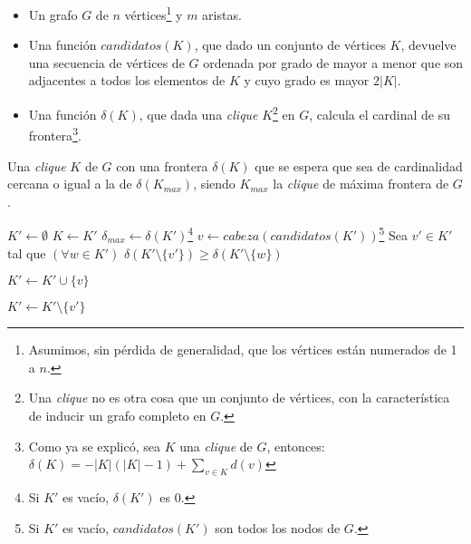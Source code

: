 \begin{pseudocodigo}
    \Require\Statex
        \begin{itemize}
            \item Un grafo $G$ de $n$ v\'ertices\footnote{Asumimos, sin p\'erdida 
                de generalidad, que los v\'ertices est\'an numerados de 1 a $n$.}
                y $m$ aristas.

            \item Una funci\'on $candidatos(K)$, que dado un conjunto de v\'ertices
                $K$, devuelve una secuencia de v\'ertices de $G$ ordenada por grado
                de mayor a menor que son adjacentes a todos los elementos de $K$ y
                cuyo grado es mayor $2|K|$.

            \item Una funci\'on $\delta(K)$, que dada una \emph{clique} $K$\footnote{Una
                \emph{clique} no es otra cosa que un conjunto de v\'ertices, con la
                caracter\'istica de inducir un grafo completo en $G$.} en $G$, calcula
                el cardinal de su frontera\footnote{Como ya se explic\'o, sea $K$ una
                \emph{clique} de $G$, entonces: $\delta(K) = - |K|(|K|-1) +
                \displaystyle\sum_{v \in K} d(v)$}.
        \end{itemize}

    \Statex
    \Ensure Una \emph{clique} $K$ de $G$ con una frontera $\delta(K)$ que se
        espera que sea de cardinalidad cercana o igual a la de $\delta(K_{max})$,
        siendo $K_{max}$ la \emph{clique} de m\'axima frontera de $G$.

    \Statex
    \State $K' \gets \emptyset$
    \Repeat
        \State $K \gets K'$
        \State $\delta_{max} \gets \delta(K')$\footnote{Si $K'$ es vac\'io, $\delta(K')$ es $0$.}
        \State $v \gets cabeza(candidatos(K'))$\footnote{Si $K'$ es vac\'io, $candidatos(K')$ son todos
            los nodos de $G$.}
        \State Sea $v' \in K'$ tal que $(\forall w \in K')$
            $\delta(K' \setminus \{v'\}) \geq \delta(K' \setminus \{w\})$

            \State $K' \gets K' \cup \{v\}$

        \Else
            \State $K' \gets K' \setminus \{v'\}$

        \EndIf


    \State {}
\end{pseudocodigo}
